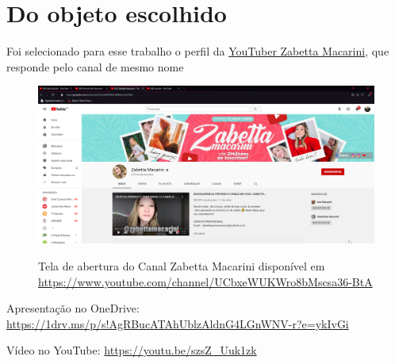 \section{Do objeto escolhido}

Foi selecionado para esse trabalho o perfil da \href{https://www.youtube.com/channel/UCbxeWUKWro8bMscsa36-BtA}{YouTuber Zabetta Macarini}, que responde pelo canal  de mesmo nome


\begin{figure}
    \centering
    \href{https://www.youtube.com/channel/UCbxeWUKWro8bMscsa36-BtA}{
        \includegraphics[width=0.999\linewidth]{fig/Canal-Zabetta-Macarini}
    }
    \caption{Tela de abertura do Canal Zabetta Macarini disponível em \url{https://www.youtube.com/channel/UCbxeWUKWro8bMscsa36-BtA}}
    \label{fig:canal-zabetta-macarini}
\end{figure}




Apresentação no OneDrive: \url{https://1drv.ms/p/s!AgRBucATAhUblzAldnG4LGnWNV-r?e=ykIvGi} \\
\begin{center}
    \href{https://1drv.ms/p/s!AgRBucATAhUblzAldnG4LGnWNV-r?e=ykIvGi}{
    }
\end{center}


Vídeo no YouTube: \url{https://youtu.be/szsZ_Uuk1zk} \\
\begin{center}
    \href{https://youtu.be/szsZ_Uuk1zk}{
    }
\end{center}
